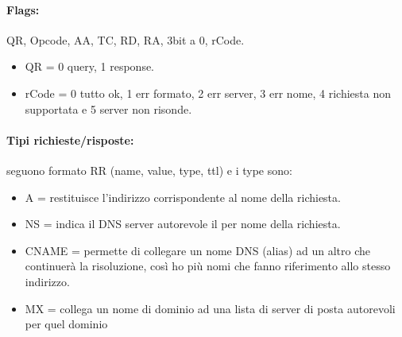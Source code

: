 \paragraph{Flags:} QR, Opcode, AA, TC, RD, RA, 3bit a 0, rCode.
\begin{itemize}
	\item QR = 0 query, 1 response.
	\item rCode = 0 tutto ok, 1 err formato, 2 err server, 3 err nome, 4 richiesta non supportata e 5 server non risonde.
\end{itemize}
\paragraph{Tipi richieste/risposte:} seguono formato RR (name, value, type, ttl) e i type sono:
\begin{itemize}
	\item A = restituisce l'indirizzo corrispondente al nome della richiesta.
	\item NS = indica il DNS server autorevole il per nome della richiesta.
	\item CNAME = permette di collegare un nome DNS (alias) ad un altro che continuerà la risoluzione, così ho più nomi che fanno riferimento allo stesso indirizzo.
	\item MX = collega un nome di dominio ad una lista di server di posta autorevoli per quel dominio
\end{itemize}
